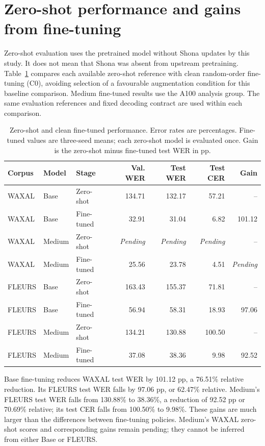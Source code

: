 \documentclass[12pt,a4paper]{report}
\begin{document}
\section{Zero-shot performance and gains from fine-tuning}
\label{sec:zero}

Zero-shot evaluation uses the pretrained model without Shona updates by this
study. It does not mean that Shona was absent from upstream pretraining.
Table~\ref{tab:zero} compares each available zero-shot reference with clean
random-order fine-tuning (C0), avoiding selection of a favourable augmentation
condition for this baseline comparison. Medium fine-tuned results use the
A100 analysis group. The same evaluation references and fixed decoding
contract are used within each comparison.

\begin{table}[htbp]\centering\small
\caption{Zero-shot and clean fine-tuned performance. Error rates are percentages.
Fine-tuned values are three-seed means; each zero-shot model is evaluated once.
Gain is the zero-shot minus fine-tuned test WER in pp.}
\label{tab:zero}
\setlength{\tabcolsep}{4pt}
\begin{tabular}{lllrrrr}\toprule
Corpus & Model & Stage & Val. WER & Test WER & Test CER & Gain\\\midrule
WAXAL & Base & Zero-shot & 134.71 & 132.17 & 57.21 & -- \\
WAXAL & Base & Fine-tuned & 32.91 & 31.04 & 6.82 & 101.12 \\
WAXAL & Medium & Zero-shot & \textit{Pending} & \textit{Pending} & \textit{Pending} & -- \\
WAXAL & Medium & Fine-tuned & 25.56 & 23.78 & 4.51 & \textit{Pending} \\
FLEURS & Base & Zero-shot & 163.43 & 155.37 & 71.81 & -- \\
FLEURS & Base & Fine-tuned & 56.94 & 58.31 & 18.93 & 97.06 \\
FLEURS & Medium & Zero-shot & 134.21 & 130.88 & 100.50 & -- \\
FLEURS & Medium & Fine-tuned & 37.08 & 38.36 & 9.98 & 92.52 \\
\bottomrule\end{tabular}\end{table}

Base fine-tuning reduces WAXAL test WER by 101.12 pp, a 76.51\% relative
reduction. Its FLEURS test WER falls by 97.06 pp, or 62.47\% relative.
Medium's FLEURS test WER falls from 130.88\% to 38.36\%, a reduction of
92.52 pp or 70.69\% relative; its test CER falls from 100.50\% to 9.98\%.
These gains are much larger than the differences between fine-tuning policies.
Medium's WAXAL zero-shot scores and corresponding gains remain pending;
they cannot be inferred from either Base or FLEURS.
\end{document}
